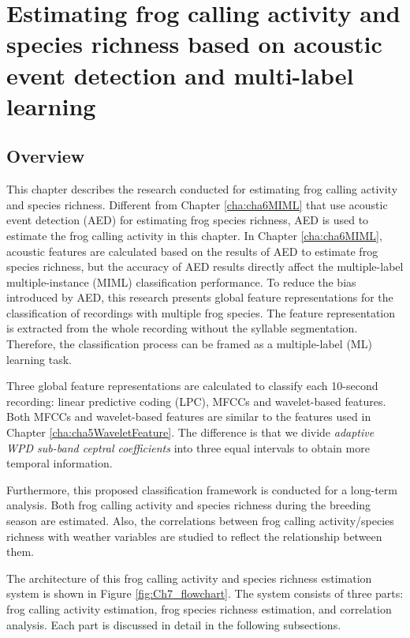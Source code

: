
\chapter{Estimating frog calling activity and species richness based on acoustic event detection and multi-label learning}
\label{cha:cha7ML}


\section{Overview}
\label{sect:introduction}

This chapter describes the research conducted for estimating frog calling activity and species richness. Different from Chapter \ref{cha:cha6MIML} that use acoustic event detection (AED) for estimating frog species richness, AED is used to estimate the frog calling activity in this chapter.
In Chapter \ref{cha:cha6MIML}, acoustic features are calculated based on the results of AED to estimate frog species richness, but the accuracy of AED results directly affect the multiple-label multiple-instance (MIML) classification performance.
To reduce the bias introduced by AED, this research presents global feature representations for the classification of recordings with multiple frog species. The feature representation is extracted from the whole recording without the syllable segmentation. Therefore, the classification process can be framed as a multiple-label (ML) learning task.  



Three global feature representations are calculated to classify each 10-second recording: linear predictive coding (LPC), MFCCs and wavelet-based features. Both MFCCs and wavelet-based features are similar to the features used in Chapter \ref{cha:cha5WaveletFeature}. The difference is that we divide \textit{adaptive WPD sub-band ceptral coefficients} into three equal intervals to obtain more temporal information.


 
Furthermore, this proposed classification framework is conducted for a long-term analysis. Both frog calling activity and species richness during the breeding season are estimated. Also, the correlations between frog calling activity/species richness with weather variables are studied to reflect the relationship between them. 

  
The architecture of this frog calling activity and species richness estimation system is shown in Figure \ref{fig:Ch7_flowchart}. The system consists of three parts: frog calling activity estimation, frog species richness estimation, and correlation analysis. Each part is discussed in detail in the following subsections.

